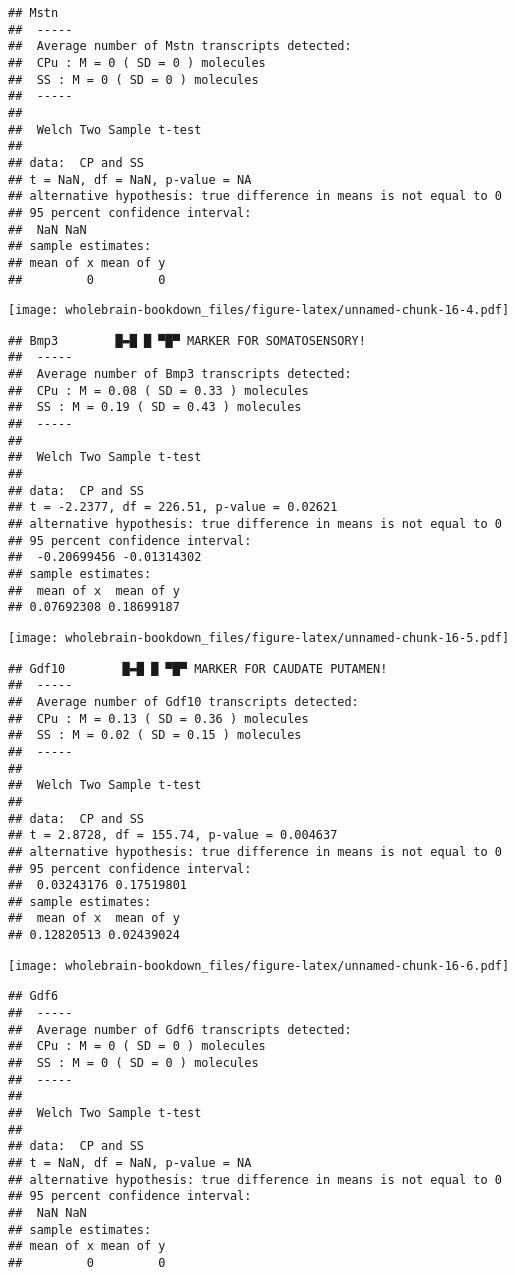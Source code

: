 \documentclass[]{book}
\theoremstyle{definition}
\theoremstyle{definition}
\theoremstyle{remark}
\begin{document}
\begin{verbatim}
## Mstn
##  -----
##  Average number of Mstn transcripts detected:
##  CPu : M = 0 ( SD = 0 ) molecules 
##  SS : M = 0 ( SD = 0 ) molecules
##  -----
## 
##  Welch Two Sample t-test
## 
## data:  CP and SS
## t = NaN, df = NaN, p-value = NA
## alternative hypothesis: true difference in means is not equal to 0
## 95 percent confidence interval:
##  NaN NaN
## sample estimates:
## mean of x mean of y 
##         0         0
\end{verbatim}

\texttt{[image: wholebrain-bookdown\_files/figure-latex/unnamed-chunk-16-4.pdf]}

\begin{verbatim}
## Bmp3        █▬█ █ ▀█▀ MARKER FOR SOMATOSENSORY!
##  -----
##  Average number of Bmp3 transcripts detected:
##  CPu : M = 0.08 ( SD = 0.33 ) molecules 
##  SS : M = 0.19 ( SD = 0.43 ) molecules
##  -----
## 
##  Welch Two Sample t-test
## 
## data:  CP and SS
## t = -2.2377, df = 226.51, p-value = 0.02621
## alternative hypothesis: true difference in means is not equal to 0
## 95 percent confidence interval:
##  -0.20699456 -0.01314302
## sample estimates:
##  mean of x  mean of y 
## 0.07692308 0.18699187
\end{verbatim}

\texttt{[image: wholebrain-bookdown\_files/figure-latex/unnamed-chunk-16-5.pdf]}

\begin{verbatim}
## Gdf10        █▬█ █ ▀█▀ MARKER FOR CAUDATE PUTAMEN!
##  -----
##  Average number of Gdf10 transcripts detected:
##  CPu : M = 0.13 ( SD = 0.36 ) molecules 
##  SS : M = 0.02 ( SD = 0.15 ) molecules
##  -----
## 
##  Welch Two Sample t-test
## 
## data:  CP and SS
## t = 2.8728, df = 155.74, p-value = 0.004637
## alternative hypothesis: true difference in means is not equal to 0
## 95 percent confidence interval:
##  0.03243176 0.17519801
## sample estimates:
##  mean of x  mean of y 
## 0.12820513 0.02439024
\end{verbatim}

\texttt{[image: wholebrain-bookdown\_files/figure-latex/unnamed-chunk-16-6.pdf]}

\begin{verbatim}
## Gdf6
##  -----
##  Average number of Gdf6 transcripts detected:
##  CPu : M = 0 ( SD = 0 ) molecules 
##  SS : M = 0 ( SD = 0 ) molecules
##  -----
## 
##  Welch Two Sample t-test
## 
## data:  CP and SS
## t = NaN, df = NaN, p-value = NA
## alternative hypothesis: true difference in means is not equal to 0
## 95 percent confidence interval:
##  NaN NaN
## sample estimates:
## mean of x mean of y 
##         0         0
\end{verbatim}
\end{document}
